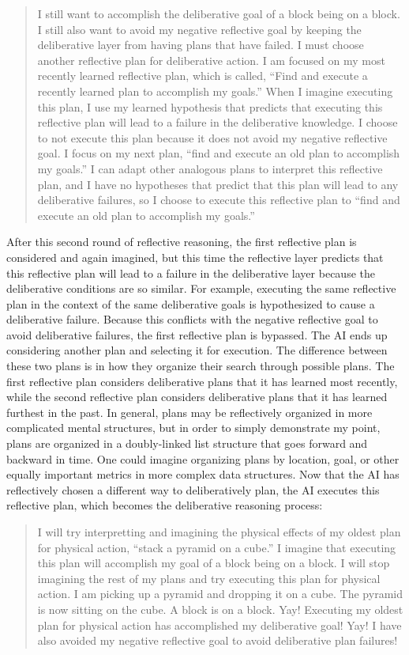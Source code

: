 \begin{quote}
  I still want to accomplish the deliberative goal of a block being on
  a block.  I still also want to avoid my negative reflective goal by
  keeping the deliberative layer from having plans that have failed.
  I must choose another reflective plan for deliberative action.  I am
  focused on my most recently learned reflective plan, which is
  called, ``Find and execute a recently learned plan to accomplish my
  goals.''  When I imagine executing this plan, I use my learned
  hypothesis that predicts that executing this reflective plan will
  lead to a failure in the deliberative knowledge.  I choose to not
  execute this plan because it does not avoid my negative reflective
  goal.  I focus on my next plan, ``find and execute an old plan to
  accomplish my goals.''  I can adapt other analogous plans to
  interpret this reflective plan, and I have no hypotheses that
  predict that this plan will lead to any deliberative failures, so I
  choose to execute this reflective plan to ``find and execute an old
  plan to accomplish my goals.''
\end{quote}
After this second round of reflective reasoning, the first reflective
plan is considered and again imagined, but this time the reflective
layer predicts that this reflective plan will lead to a failure in the
deliberative layer because the deliberative conditions are so similar.
For example, executing the same reflective plan in the context of the
same deliberative goals is hypothesized to cause a deliberative
failure.  Because this conflicts with the negative reflective goal to
avoid deliberative failures, the first reflective plan is bypassed.
The AI ends up considering another plan and selecting it for
execution.  The difference between these two plans is in how they
organize their search through possible plans.  The first reflective
plan considers deliberative plans that it has learned most recently,
while the second reflective plan considers deliberative plans that it
has learned furthest in the past.  In general, plans may be
reflectively organized in more complicated mental structures, but in
order to simply demonstrate my point, plans are organized in a
doubly-linked list structure that goes forward and backward in time.
One could imagine organizing plans by location, goal, or other equally
important metrics in more complex data structures.  Now that the AI
has reflectively chosen a different way to deliberatively plan, the AI
executes this reflective plan, which becomes the deliberative
reasoning process:
\begin{quote}
  I will try interpretting and imagining the physical effects of my
  oldest plan for physical action, ``stack a pyramid on a cube.''  I
  imagine that executing this plan will accomplish my goal of a block
  being on a block.  I will stop imagining the rest of my plans and
  try executing this plan for physical action.  I am picking up a
  pyramid and dropping it on a cube.  The pyramid is now sitting on
  the cube.  A block is on a block.  Yay!  Executing my oldest plan
  for physical action has accomplished my deliberative goal!  Yay!  I
  have also avoided my negative reflective goal to avoid deliberative
  plan failures!
\end{quote}
